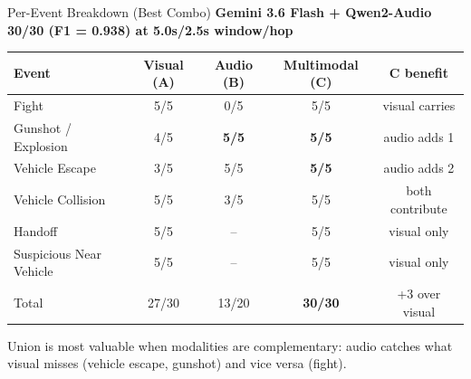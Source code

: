 \documentclass[aspectratio=169,10pt]{beamer}
\begin{document}
\begin{frame}{Per-Event Breakdown (Best Combo)}
\centering
\footnotesize
\textbf{Gemini 3.6 Flash + Qwen2-Audio \hspace{0.5em} 30/30 (F1 = 0.938) at 5.0s/2.5s window/hop}
\vspace{\baselineskip}

\begin{tabular}{lcccc}
\toprule
Event & Visual (A) & Audio (B) & Multimodal (C) & C benefit \\
\midrule
Fight & 5/5 & 0/5 & 5/5 & visual carries \\
Gunshot / Explosion & 4/5 & \textbf{5/5} & \textbf{5/5} & audio adds 1 \\
Vehicle Escape & 3/5 & 5/5 & \textbf{5/5} & audio adds 2 \\
Vehicle Collision & 5/5 & 3/5 & 5/5 & both contribute \\
Handoff & 5/5 & -- & 5/5 & visual only \\
     Suspicious Near Vehicle & 5/5 & -- & 5/5 & visual only \\
     \midrule
     Total & 27/30 & 13/20 & \textbf{30/30} & +3 over visual \\
\bottomrule
\end{tabular}

\vspace{\baselineskip}
Union is most valuable when modalities are complementary: audio catches what visual misses (vehicle escape, gunshot) and vice versa (fight).
\end{frame}

\end{document}
